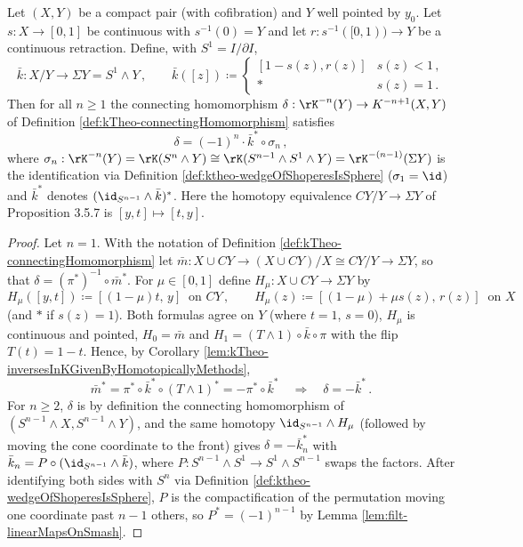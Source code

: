 \begin{lemma}\label{lem:filt-deltaViaCollar}
	Let $(X,Y)$ be a compact pair (with cofibration) and $Y$ well pointed by $y_0$. Let $s:X\to[0,1]$ be continuous with $s^{-1}(0)=Y$ and let $r:s^{-1}([0,1))\to Y$ be a continuous retraction. Define, with $S^1=I/\partial I$,
	\begin{equation*}
		\bar k:X/Y\to\Sigma Y=S^1\wedge Y\,,\qquad \bar k([z])\coloneq\begin{cases}[1-s(z),r(z)]&s(z)<1\,,\\ \ast & s(z)=1\,.\end{cases}
	\end{equation*}
	Then for all $n\geq 1$ the connecting homomorphism $\delta:\rK^{-n}(Y)\to K^{-n+1}(X,Y)$ of Definition \ref{def:kTheo-connectingHomomorphism} satisfies
	\begin{equation*}
		\delta=(-1)^n\cdot\bar k^*\circ\sigma_n\,,
	\end{equation*}
	where $\sigma_n:\rK^{-n}(Y)=\rK(S^n\wedge Y)\cong\rK(S^{n-1}\wedge S^1\wedge Y)=\rK^{-(n-1)}(\Sigma Y)$ is the identification via Definition \ref{def:ktheo-wedgeOfShoperesIsSphere} ($\sigma_1=\id$) and $\bar k^*$ denotes $(\id_{S^{n-1}}\wedge\bar k)^*$. Here the homotopy equivalence $CY/Y\to\Sigma Y$ of Proposition 3.5.7 is $[y,t]\mapsto[t,y]$.
\end{lemma}
\begin{proof}
	Let $n=1$. With the notation of Definition \ref{def:kTheo-connectingHomomorphism} let $\bar m:X\cup CY\to (X\cup CY)/X\cong CY/Y\to\Sigma Y$, so that $\delta=(\pi^*)^{-1}\circ\bar m^*$. For $\mu\in[0,1]$ define $H_\mu:X\cup CY\to\Sigma Y$ by
	\begin{equation*}
		H_\mu([y,t])\coloneq[(1-\mu)t,\,y]\ \text{ on } CY\,,\qquad H_\mu(z)\coloneq[(1-\mu)+\mu s(z),\,r(z)]\ \text{ on } X
	\end{equation*}
	(and $\ast$ if $s(z)=1$). Both formulas agree on $Y$ (where $t=1$, $s=0$), $H_\mu$ is continuous and pointed, $H_0=\bar m$ and $H_1=(T\wedge 1)\circ\bar k\circ\pi$ with the flip $T(t)=1-t$. Hence, by Corollary \ref{lem:kTheo-inversesInKGivenByHomotopicallyMethods},
	\begin{equation*}
		\bar m^*=\pi^*\circ\bar k^*\circ(T\wedge 1)^*=-\pi^*\circ\bar k^*\quad\Longrightarrow\quad \delta=-\bar k^*\,.
	\end{equation*}
	For $n\geq 2$, $\delta$ is by definition the connecting homomorphism of $(S^{n-1}\wedge X,S^{n-1}\wedge Y)$, and the same homotopy $\id_{S^{n-1}}\wedge H_\mu$ (followed by moving the cone coordinate to the front) gives $\delta=-\bar k_n^*$ with $\bar k_n=P\circ(\id_{S^{n-1}}\wedge\bar k)$, where $P:S^{n-1}\wedge S^1\to S^1\wedge S^{n-1}$ swaps the factors. After identifying both sides with $S^n$ via Definition \ref{def:ktheo-wedgeOfShoperesIsSphere}, $P$ is the compactification of the permutation moving one coordinate past $n-1$ others, so $P^*=(-1)^{n-1}$ by Lemma \ref{lem:filt-linearMapsOnSmash}.
\end{proof}

